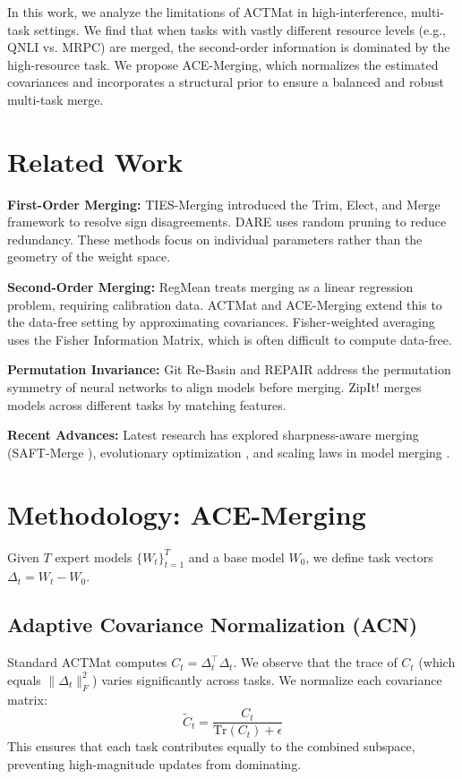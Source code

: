 \documentclass{article} %
\begin{document}
In this work, we analyze the limitations of ACTMat in high-interference, multi-task settings. We find that when tasks with vastly different resource levels (e.g., QNLI vs. MRPC) are merged, the second-order information is dominated by the high-resource task. We propose ACE-Merging, which normalizes the estimated covariances and incorporates a structural prior to ensure a balanced and robust multi-task merge.

\section{Related Work}
\textbf{First-Order Merging:} TIES-Merging \citep{yadav2023ties} introduced the Trim, Elect, and Merge framework to resolve sign disagreements. DARE \citep{yu2023dare} uses random pruning to reduce redundancy. These methods focus on individual parameters rather than the geometry of the weight space.

\textbf{Second-Order Merging:} RegMean \citep{jin2023regmean} treats merging as a linear regression problem, requiring calibration data. ACTMat \citep{hameed2026model} and ACE-Merging \citep{xu2026acemerging} extend this to the data-free setting by approximating covariances. Fisher-weighted averaging \citep{matena2022fisher} uses the Fisher Information Matrix, which is often difficult to compute data-free.

\textbf{Permutation Invariance:} Git Re-Basin \citep{ainsworth2023gitrebasin} and REPAIR \citep{jordan2023repair} address the permutation symmetry of neural networks to align models before merging. ZipIt! \citep{stoica2023zipit} merges models across different tasks by matching features.

\textbf{Recent Advances:} Latest research has explored sharpness-aware merging (SAFT-Merge \citep{zhang2025saft}), evolutionary optimization \citep{li2024evolutionary}, and scaling laws in model merging \citep{huang2025scaling}.

\section{Methodology: ACE-Merging}
Given $T$ expert models $\{W_t\}_{t=1}^T$ and a base model $W_0$, we define task vectors $\Delta_t = W_t - W_0$.

\subsection{Adaptive Covariance Normalization (ACN)}
Standard ACTMat computes $C_t = \Delta_t^\top \Delta_t$. We observe that the trace of $C_t$ (which equals $\|\Delta_t\|_F^2$) varies significantly across tasks. We normalize each covariance matrix:
\begin{equation}
    \tilde{C}_t = \frac{C_t}{\text{Tr}(C_t) + \epsilon}
\end{equation}
This ensures that each task contributes equally to the combined subspace, preventing high-magnitude updates from dominating.
\end{document}
